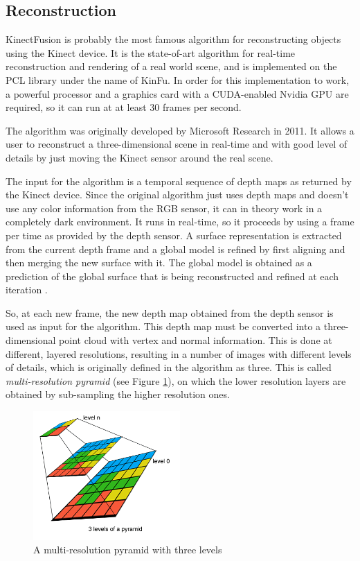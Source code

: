 \documentclass[msc, a4paper, classic, en]{ufbathesis}
\begin{document}
\subsection{Reconstruction}
\label{sec:kinfu}

KinectFusion \cite{kinfu} \cite{kinfu2} is probably the most famous algorithm for reconstructing objects using the Kinect device. It is the state-of-art algorithm for real-time reconstruction and rendering of a real world scene, and is implemented on the PCL \cite{pcl} library under the name of KinFu. In order for this implementation to work, a powerful processor and a graphics card with a CUDA-enabled Nvidia GPU are required, so it can run at at least 30 frames per second.

The algorithm was originally developed by Microsoft Research in 2011. It allows a user to reconstruct a three-dimensional scene in real-time and with good level of details by just moving the Kinect sensor around the real scene.

The input for the algorithm is a temporal sequence of depth maps as returned by the Kinect device. Since the original algorithm just uses depth maps and doesn't use any color information from the RGB sensor, it can in theory work in a completely dark environment. It runs in real-time, so it proceeds by using a frame per time as provided by the depth sensor. A surface representation is extracted from the current depth frame and a global model is refined by first aligning and then merging the new surface with it. The global model is obtained as a prediction of the global surface that is being reconstructed and refined at each iteration \cite{michele}.

So, at each new frame, the new depth map obtained from the depth sensor is used as input for the algorithm. This depth map must be converted into a three-dimensional point cloud with vertex and normal information. This is done at different, layered resolutions, resulting in a number of images with different levels of details, which is originally defined in the algorithm as three. This is called \textit{multi-resolution pyramid} (see Figure \ref{fig:pyr}), on which the lower resolution layers are obtained by sub-sampling the higher resolution ones.

\begin{figure}
\centering
\includegraphics[width=0.5\textwidth]{images/pyr.png}
\caption{A multi-resolution pyramid with three levels \cite{michele}}
\label{fig:pyr}
\end{figure}
\end{document}
